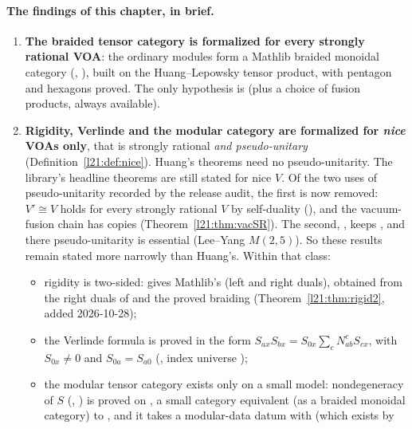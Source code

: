 \paragraph{The findings of this chapter, in brief.}
\begin{enumerate}
\item \textbf{The braided tensor category is formalized for every strongly rational VOA}: the ordinary modules form a
  Mathlib braided monoidal category (,
  ), built on the Huang--Lepowsky tensor product, with pentagon and hexagons
  proved. The only hypothesis is  (plus a choice  of fusion products, always available).
\item \textbf{Rigidity, Verlinde and the modular category are formalized for \emph{nice} VOAs only}, that is strongly
  rational \emph{and pseudo-unitary} (Definition~\ref{l21:def:nice}). Huang's theorems need no pseudo-unitarity. The
  library's headline theorems are still stated for nice $V$. Of the two uses of pseudo-unitarity recorded by the release
  audit, the first is now removed: $V'\cong V$ holds for every strongly rational $V$ by self-duality
  (), and the vacuum-fusion chain has  copies
  (Theorem~\ref{l21:thm:vacSR}). The second, , keeps , and there
  pseudo-unitarity is essential (Lee--Yang $M(2,5)$). So these results remain stated more narrowly than Huang's. Within
  that class:
  \begin{itemize}
  \item rigidity is two-sided:  gives Mathlib's  (left and right duals), obtained
    from the right duals of  and the proved braiding (Theorem~\ref{l21:thm:rigid2}, added
    2026-10-28);
  \item the Verlinde formula is proved in the form $S_{ax}S_{bx}=S_{0x}\sum_cN_{ab}^cS_{cx}$, with $S_{0x}\ne0$ and
    $S_{0a}=S_{a0}$ (, index universe );
  \item the modular tensor category exists only on a small model: nondegeneracy of $S$ (,
    ) is proved on , a small category equivalent (as a braided monoidal
    category) to , and it takes a modular-data datum  with  (which exists by

\end{itemize}
\end{enumerate}
